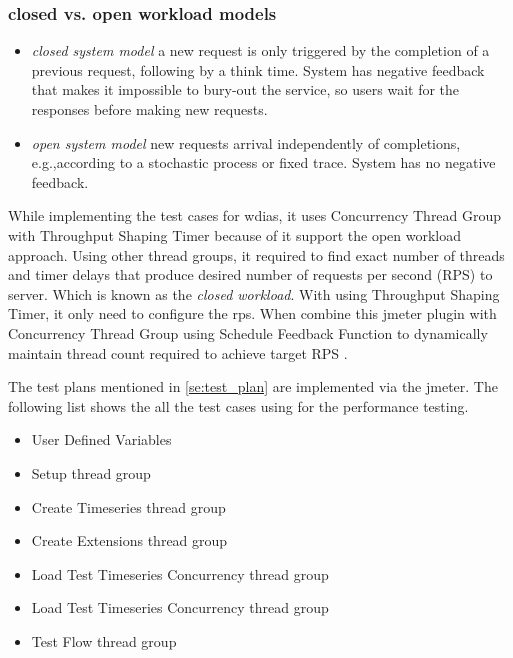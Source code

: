 \subsubsection{closed vs. open workload models}
\label{subse:closed_vs_open_workload}
\begin{itemize}
    \item \emph{closed system model} \cite{Haggett1998AnWales} a new request is only triggered by the completion of a previous request, following by a think time. System has negative feedback that makes it impossible to bury-out the service, so users wait for the responses before making new requests.
    \item \emph{open system model} new requests arrival independently of completions, e.g.,according to a stochastic process or fixed trace. System has no negative feedback.
\end{itemize}
While implementing the test cases for \acrshort{wdias}, it uses Concurrency Thread Group with Throughput Shaping Timer because of it support the open workload approach.
Using other thread groups, it required to find exact number of threads and timer delays that produce desired number of requests per second (RPS) to server. Which is known as the \emph{closed workload}.
With using Throughput Shaping Timer, it only need to configure the \acrfull{rps}. When combine this \acrshort{jmeter} plugin with Concurrency Thread Group using Schedule Feedback Function to dynamically maintain thread count required to achieve target RPS \cite{KarunarathneGihanWdias/wdias-performance-test:JMeter.}.

The test plans mentioned in \ref{se:test_plan} are implemented via the \acrshort{jmeter}. The following list shows the all the test cases using for the performance testing.

\begin{itemize}
    \item User Defined Variables
    \item Setup thread group
    \item Create Timeseries thread group
    \item Create Extensions thread group
    \item Load Test Timeseries Concurrency thread group
    \item Load Test Timeseries Concurrency thread group
    \item Test Flow thread group
\end{itemize}

